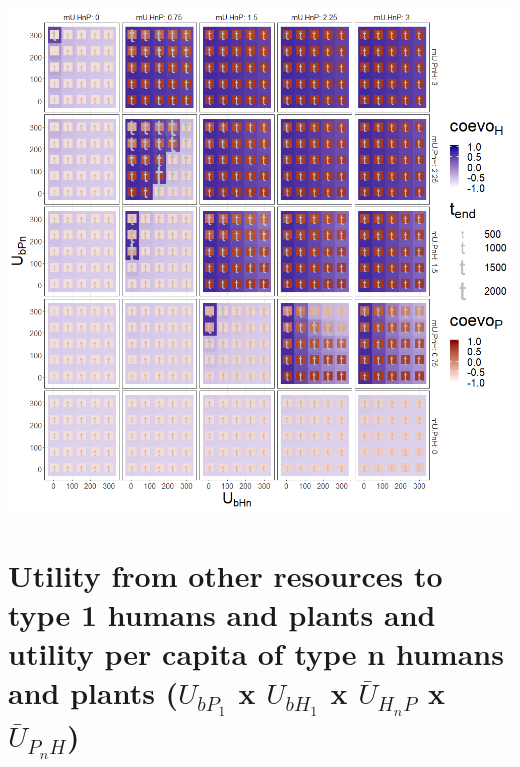\documentclass[
]{book}
\begin{document}
\newpage

\includegraphics[width=1\linewidth]{plots/4_fourPar-U.bn-mUn_plot}

\newpage

\hypertarget{utility-from-other-resources-to-type-1-humans-and-plants-and-utility-per-capita-of-type-n-humans-and-plants-u_bp_1-x-u_bh_1-x-baru_h_np-x-baru_p_nh}{%
\section{\texorpdfstring{Utility from other resources to type 1 humans and plants and utility per capita of type n humans and plants (\(U_{bP_{1}}\) x \(U_{bH_{1}}\) x \(\bar{U}_{H_{n}P}\) x \(\bar{U}_{P_{n}H}\))}{Utility from other resources to type 1 humans and plants and utility per capita of type n humans and plants (U\_\{bP\_\{1\}\} x U\_\{bH\_\{1\}\} x \textbackslash bar\{U\}\_\{H\_\{n\}P\} x \textbackslash bar\{U\}\_\{P\_\{n\}H\})}}\label{utility-from-other-resources-to-type-1-humans-and-plants-and-utility-per-capita-of-type-n-humans-and-plants-u_bp_1-x-u_bh_1-x-baru_h_np-x-baru_p_nh}}

\end{document}
